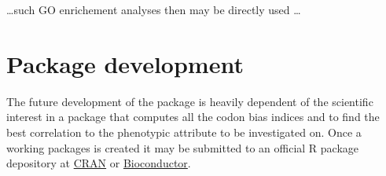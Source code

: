 \dots such GO enrichement analyses then may be directly used \dots \\

\section{Package development}
The future development of the package is heavily dependent of the scientific interest in a package that computes all the codon bias indices and to find the best correlation to the phenotypic attribute to be investigated on. 
Once a working packages is created it may be submitted to an official R package depository at \href{https://cran.r-project.org/doc/manuals/r-release/R-exts.html}{CRAN} or \href{https://www.bioconductor.org/developers/how-to/buildingPackagesForBioc/}{Bioconductor}.

